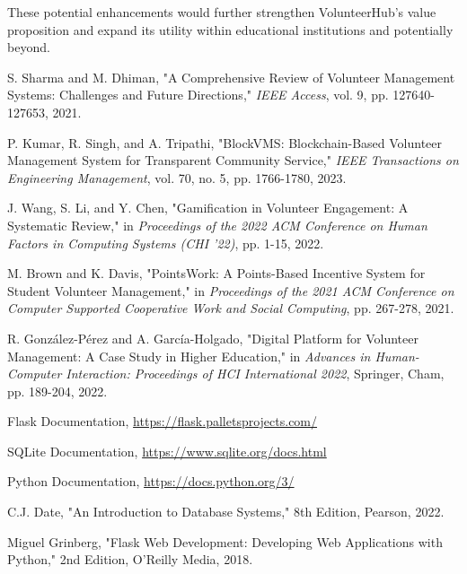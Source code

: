 \documentclass[12pt,a4paper]{report}
\begin{document}
These potential enhancements would further strengthen VolunteerHub's value proposition and expand its utility within educational institutions and potentially beyond.


\clearpage
{}
\renewcommand{\bibname}{References} %

\begin{thebibliography}{9}
     S. Sharma and M. Dhiman, "A Comprehensive Review of Volunteer Management Systems: Challenges and Future Directions," \textit{IEEE Access}, vol. 9, pp. 127640-127653, 2021.
    
     P. Kumar, R. Singh, and A. Tripathi, "BlockVMS: Blockchain-Based Volunteer Management System for Transparent Community Service," \textit{IEEE Transactions on Engineering Management}, vol. 70, no. 5, pp. 1766-1780, 2023.
    
     J. Wang, S. Li, and Y. Chen, "Gamification in Volunteer Engagement: A Systematic Review," in \textit{Proceedings of the 2022 ACM Conference on Human Factors in Computing Systems (CHI '22)}, pp. 1-15, 2022.
    
     M. Brown and K. Davis, "PointsWork: A Points-Based Incentive System for Student Volunteer Management," in \textit{Proceedings of the 2021 ACM Conference on Computer Supported Cooperative Work and Social Computing}, pp. 267-278, 2021.

     R. González-Pérez and A. García-Holgado, "Digital Platform for Volunteer Management: A Case Study in Higher Education," in \textit{Advances in Human-Computer Interaction: Proceedings of HCI International 2022}, Springer, Cham, pp. 189-204, 2022.
    
     Flask Documentation, \url{https://flask.palletsprojects.com/}
    
     SQLite Documentation, \url{https://www.sqlite.org/docs.html}
    
     Python Documentation, \url{https://docs.python.org/3/}
    
     C.J. Date, "An Introduction to Database Systems," 8th Edition, Pearson, 2022.
    
     Miguel Grinberg, "Flask Web Development: Developing Web Applications with Python," 2nd Edition, O'Reilly Media, 2018.
\end{thebibliography}
\end{document}
